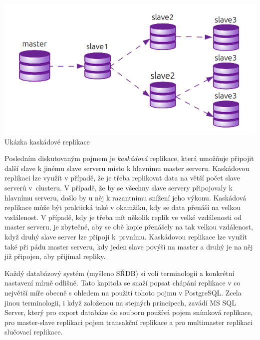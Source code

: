   \begin{center}
       \includegraphics[scale=1]{obr/schema_kaskadova.png}\\
       Ukázka kaskádové replikace
  \end{center}
  Posledním diskutovaným pojmem je {\it kaskádová} replikace, která u\-mož\-ňu\-je
  připojit další slave k jinému slave serveru místo k hlavnímu master serveru.
  Kaskádovou replikaci lze využít v případě, že je třeba replikovat data na větší
  počet slave serverů v~clusteru. V případě, že by se všechny slave servery
  při\-po\-jo\-va\-ly k hlavnímu serveru, došlo by u něj k razantnímu snížení jeho
  výkonu. Kaskádová replikace může být praktická také v okamžiku, kdy se data
  přenáší na velkou vz\-dá\-le\-nost. V případě, kdy je třeba mít několik replik ve
  velké vzdálenosti od master serveru, je zbytečné, aby se obě kopie přenášely na
  tak velkou vz\-dá\-le\-nost, když druhý slave server lze připoji k~prvnímu.
  Kaskádovou replikace lze využít také při pádu master serveru, kdy jeden slave
  povýší na master a druhý je na něj již připojen, aby přijímal repliky.


  Každý  databázový systém (myšleno SŘDB) si volí terminologii a konkrétní
  nas\-ta\-ve\-ní mírně odlišně. Tato kapitola se snaží popsat chápání replikace
  v co největší míře obecně s ohledem na použití tohoto pojmu v PostgreSQL. Zcela
  jinou terminologii, i když založenou na stejných principech, zavádí MS SQL
  Server, který pro export databáze do souboru používá pojem snímková replikace,
  pro master-slave replikaci pojem transakční replikace a pro multimaster
  replikaci slučovací replikace. 



